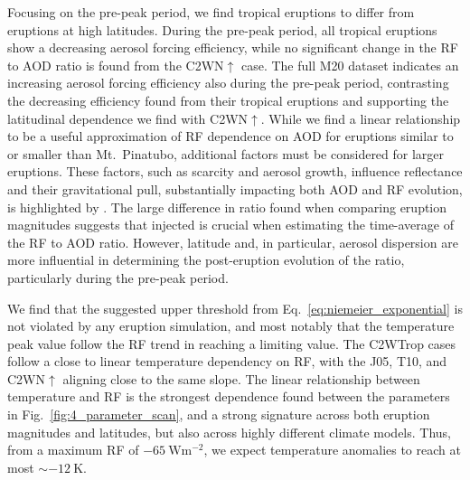 \documentclass[draft]{agujournal2019}
\begin{document}
  Focusing on the pre-peak period, we find tropical eruptions to differ from eruptions
  at high latitudes. During the pre-peak period, all tropical eruptions show a
  decreasing aerosol forcing efficiency, while no significant change in the RF to AOD
  ratio is found from the C2WN\(\uparrow\) case. The full M20 dataset indicates an
  increasing aerosol forcing efficiency also during the pre-peak period, contrasting the
  decreasing efficiency found from their tropical eruptions and supporting the
  latitudinal dependence we find with C2WN\(\uparrow\). While we find a linear
  relationship to be a useful approximation of RF dependence on AOD for eruptions
  similar to or smaller than Mt.\
  Pinatubo, additional factors must be considered for larger eruptions. These factors,
  such as \ce{OH} scarcity and aerosol growth, influence reflectance and their
  gravitational pull, substantially impacting both AOD and RF evolution, is highlighted
  by \citeA{timmreck2010}. The large difference in ratio found when comparing eruption
  magnitudes suggests that injected \ce{SO2} is crucial when estimating the time-average
  of the RF to AOD ratio. However, latitude and, in particular, aerosol dispersion are
  more influential in determining the post-eruption evolution of the ratio, particularly
  during the pre-peak period.

  We find that the suggested upper threshold from Eq.~\ref{eq:niemeier_exponential} is
  not violated by any eruption simulation, and most notably that the temperature peak
  value follow the RF trend in reaching a limiting value. The C2WTrop cases follow a
  close to linear temperature dependency on RF, with the J05, T10, and C2WN\(\uparrow\)
  aligning close to the same slope. The linear relationship between temperature and RF
  is the strongest dependence found between the parameters in
  Fig.~\ref{fig:4_parameter_scan}, and a strong signature across both eruption
  magnitudes and latitudes, but also across highly different climate models. Thus, from
  a maximum RF of \(\SI{-65}{\watt\metre^{-2}}\), we expect temperature anomalies to
  reach at most \(\sim\SI{-12}{\kelvin}\).
\end{document}
